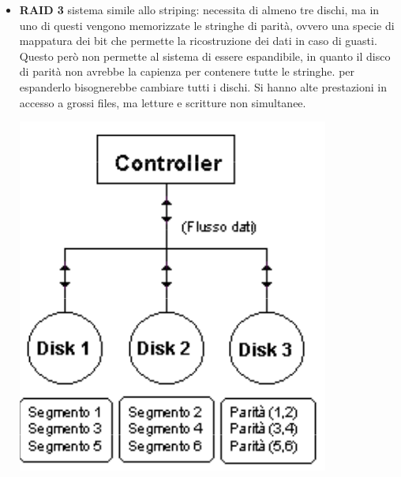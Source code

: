\documentclass[a4paper]{report}
\begin{document}
\begin{itemize}
\item \textbf{RAID 3} sistema simile allo striping: necessita di almeno tre dischi, ma in uno di questi vengono memorizzate le stringhe di parità, ovvero una specie di mappatura dei bit che permette la ricostruzione dei dati in caso di guasti. Questo però non permette al sistema di essere espandibile, in quanto il disco di parità non avrebbe la capienza per contenere tutte le stringhe. per espanderlo bisognerebbe cambiare tutti i dischi. Si hanno alte prestazioni in accesso a grossi files, ma letture e scritture non simultanee. \begin{center}\includegraphics[scale=0.5]{raid3.png}\end{center}

\end{itemize}
\end{document}
